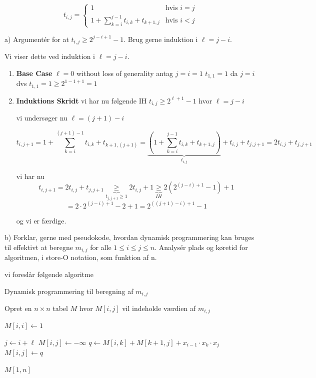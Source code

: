 \documentclass[12pt,a4paper]{article}
\begin{document}
\[t_{i,j} = \begin{cases}
1 & \text{hvis } i = j\\
1 + \sum_{k=i}^{j-1} t_{i,k} + t_{k+1,j} & \text{hvis } i < j
\end{cases}\]

a) Argumentér for at $t_{i,j} \geq 2^{j-i+1} - 1$. Brug gerne induktion i $\ell = j - i$.

Vi viser dette ved induktion i $\ell = j - i$.

\begin{enumerate}
    \item \textbf{Base Case} $\ell = 0$
    without loss of generality antag $j=i=1$
    $t_{1,1} = 1$ da $j=i$
    dvs $t_{1,1} = 1 \geq 2^{1-1+1} = 1$
    \item \textbf{Induktions Skridt}
    vi har nu følgende IH $t_{i,j} \geq 2^{\ell+1} - 1$ hvor $\ell = j-i$ 

    vi undersøger nu $\ell = (j+1) - i$

    \[t_{i, j+1} = 1 + \sum_{k=i}^{(j+1)-1} t_{i,k} + t_{k+1,(j+1)} =
    \underbrace{\left(1 +  \sum_{k=i}^{j-1} t_{i,k} + t_{k+1,j}\right)}_{t_{i,j}} + t_{i,j} + t_{j, j+1} = 2t_{i, j} + t_{j, j+1}\]

    vi har nu
    \[
    t_{i, j+1} = 2t_{i, j} + t_{j, j+1} \underbrace{\geq}_{t_{j, j+1} \geq 1} 2t_{i, j} + 1 \underbrace{\geq}_{IH} 2(2^{(j-i)+1} - 1) + 1
    \]
    \[
    = 2 \cdot 2^{(j-i)+1} - 2 + 1 =  2^{((j+1)-i)+1} - 1
    \]
    
    og vi er færdige.
\end{enumerate}

b) Forklar, gerne med pseudokode, hvordan dynamisk programmering kan bruges til effektivt at beregne $m_{i,j}$ for alle $1 \leq i \leq j \leq n$. Analysér plads og køretid for algoritmen, i store-O notation, som funktion af n.

vi foreslår følgende algoritme

\begin{algorithm}
\caption{Dynamisk programmering til beregning af $m_{i,j}$}
\begin{algorithmic}
    \State Opret en $n \times n$ tabel $M$ hvor $M[i,j]$ vil indeholde værdien af $m_{i,j}$
    
        \State $M[i,i] \gets 1$ 
    \EndFor
    
     
            \State $j \gets i + \ell$
            \State $M[i,j] \gets -\infty$ 
                \State $q \gets M[i,k] + M[k+1,j] + x_{i-1} \cdot x_k \cdot x_j$
                    \State $M[i,j] \gets q$
                \EndIf
            \EndFor
        \EndFor
    \EndFor
    
    \State \Return $M[1,n]$ 
\EndFunction
\end{algorithmic}
\end{algorithm}
\end{document}

